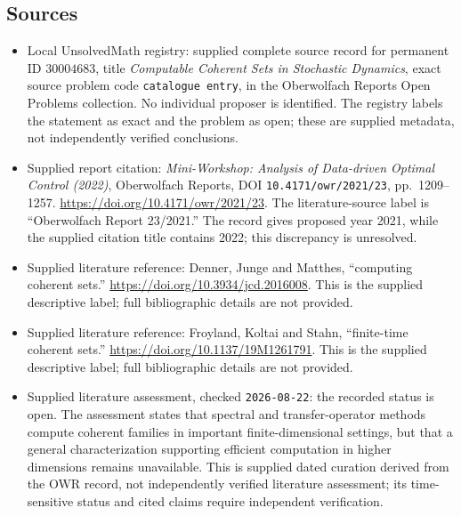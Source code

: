 \documentclass[11pt]{article}
\begin{document}
\subsection{Sources}
\begin{itemize}
\item Local UnsolvedMath registry: supplied complete source record for permanent ID \(30004683\), title \emph{Computable Coherent Sets in Stochastic Dynamics}, exact source problem code \texttt{catalogue entry}, in the Oberwolfach Reports Open Problems collection. No individual proposer is identified. The registry labels the statement as exact and the problem as open; these are supplied metadata, not independently verified conclusions.
\item Supplied report citation: \emph{Mini-Workshop: Analysis of Data-driven Optimal Control (2022)}, Oberwolfach Reports, DOI \texttt{10.4171/owr/2021/23}, pp.\ 1209--1257. \url{https://doi.org/10.4171/owr/2021/23}. The literature-source label is ``Oberwolfach Report 23/2021.'' The record gives proposed year 2021, while the supplied citation title contains 2022; this discrepancy is unresolved.
\item Supplied literature reference: Denner, Junge and Matthes, ``computing coherent sets.'' \url{https://doi.org/10.3934/jcd.2016008}. This is the supplied descriptive label; full bibliographic details are not provided.
\item Supplied literature reference: Froyland, Koltai and Stahn, ``finite-time coherent sets.'' \url{https://doi.org/10.1137/19M1261791}. This is the supplied descriptive label; full bibliographic details are not provided.
\item Supplied literature assessment, checked \texttt{2026-08-22}: the recorded status is open. The assessment states that spectral and transfer-operator methods compute coherent families in important finite-dimensional settings, but that a general characterization supporting efficient computation in higher dimensions remains unavailable. This is supplied dated curation derived from the OWR record, not independently verified literature assessment; its time-sensitive status and cited claims require independent verification.
\end{itemize}
\end{document}
